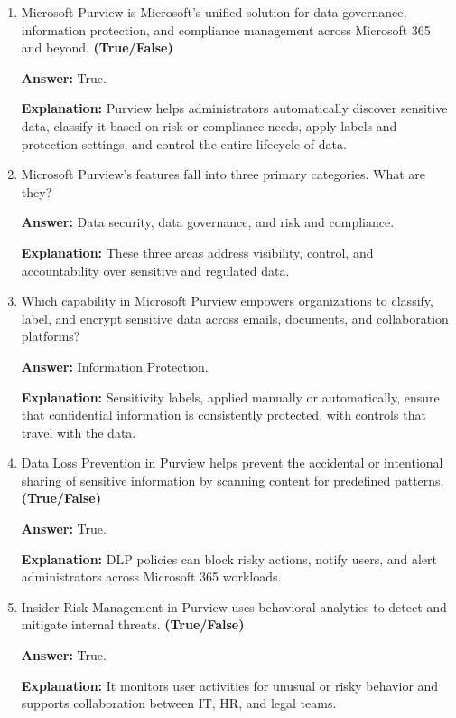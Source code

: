 \documentclass[10pt]{article}
\begin{document}
\begin{enumerate}[leftmargin=*]

\item Microsoft Purview is Microsoft’s unified solution for data governance, information protection, and compliance management across Microsoft 365 and beyond. \textbf{(True/False)}

\textbf{Answer:} True.

\textbf{Explanation:} Purview helps administrators automatically discover sensitive data, classify it based on risk or compliance needs, apply labels and protection settings, and control the entire lifecycle of data.

\item Microsoft Purview’s features fall into three primary categories. What are they?

\textbf{Answer:} Data security, data governance, and risk and compliance.

\textbf{Explanation:} These three areas address visibility, control, and accountability over sensitive and regulated data.

\item Which capability in Microsoft Purview empowers organizations to classify, label, and encrypt sensitive data across emails, documents, and collaboration platforms?

\textbf{Answer:} Information Protection.

\textbf{Explanation:} Sensitivity labels, applied manually or automatically, ensure that confidential information is consistently protected, with controls that travel with the data.

\item Data Loss Prevention in Purview helps prevent the accidental or intentional sharing of sensitive information by scanning content for predefined patterns. \textbf{(True/False)}

\textbf{Answer:} True.

\textbf{Explanation:} DLP policies can block risky actions, notify users, and alert administrators across Microsoft 365 workloads.

\item Insider Risk Management in Purview uses behavioral analytics to detect and mitigate internal threats. \textbf{(True/False)}

\textbf{Answer:} True.

\textbf{Explanation:} It monitors user activities for unusual or risky behavior and supports collaboration between IT, HR, and legal teams.


\end{enumerate}
\end{document}
